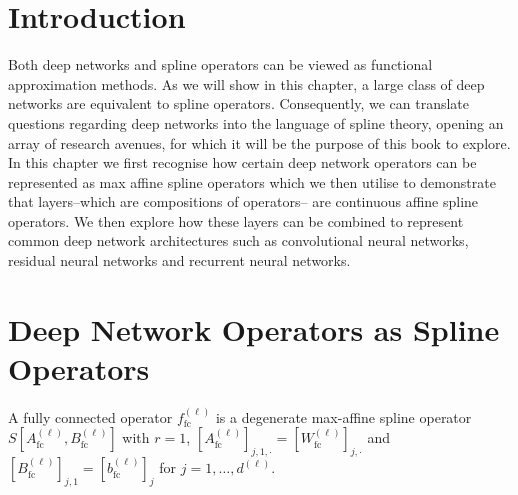 \section{Introduction}

Both deep networks and spline operators can be viewed as functional approximation methods. As we will show in this chapter, a large class of deep networks are equivalent to spline operators. Consequently, we can translate questions regarding deep networks into the language of spline theory, opening an array of research avenues, for which it will be the purpose of this book to explore. In this chapter we first recognise how certain deep network operators can be represented as max affine spline operators which we then utilise to demonstrate that layers--which are compositions of operators-- are continuous affine spline operators. We then explore how these layers can be combined to represent common deep network architectures such as convolutional neural networks, residual neural networks and recurrent neural networks.

\section{Deep Network Operators as Spline Operators}\label{sec:dno_as_so}

\begin{proposition}\label{prop:fc_maso}
    A fully connected operator $f_{\text{fc}}^{(\ell)}$ is a degenerate max-affine spline operator $S\left[A_{\text{fc}}^{(\ell)},B_{\text{fc}}^{(\ell)}\right]$ with $r=1$, $\left[A_{\text{fc}}^{(\ell)}\right]_{j,1,\cdot}=\left[W_{\text{fc}}^{(\ell)}\right]_{j,\cdot}$ and $\left[B_{\text{fc}}^{(\ell)}\right]_{j,1}=\left[b_{\text{fc}}^{(\ell)}\right]_j$ for $j=1,\dots,d^{(\ell)}$.
\end{proposition}

